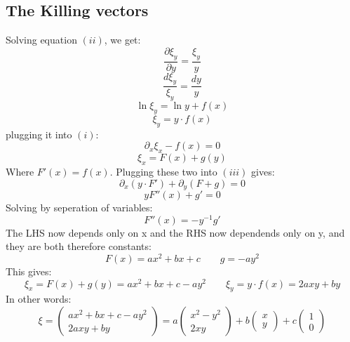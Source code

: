 \documentclass{article}
\begin{document}
\subsection{The Killing vectors}
Solving equation $(ii)$, we get:
\begin{equation}
    \frac{\partial \xi_y}{\partial y} = \frac{\xi_y}{y}
\end{equation}
\begin{equation}
    \frac{d\xi_y}{\xi_y} = \frac{dy}{y}
\end{equation}
\begin{equation}
    \ln \xi_y = \ln y + f(x)
\end{equation}
\begin{equation}
    \xi_y = y \cdot f(x)
\end{equation}
plugging it into $(i)$:
\begin{equation}
    \partial_x \xi_x - f(x) = 0
\end{equation}
\begin{equation}
    \xi_x = F(x) + g(y)
\end{equation}
Where $F'(x) = f(x)$. Plugging these two into $(iii)$ gives:
\begin{equation}
    \partial_x \left(y \cdot F'\right) + \partial_y \left(F + g\right) = 0
\end{equation}
\begin{equation}
    y F''(x) + g' = 0
\end{equation}
Solving by seperation of variables:
\begin{equation}
    F''(x) = -y^{-1}g'
\end{equation}
The LHS now depends only on x and the RHS now dependends only on y, and they are both therefore constants:
\begin{equation}
    F(x) = a x^2 + bx + c \qquad g = -a y^2
\end{equation}
This gives:
\begin{equation}
    \xi_x = F(x) + g(y) = ax^2 + bx + c - ay^2 \qquad
    \xi_y = y\cdot f(x) = 2axy + by
\end{equation}
In other words:
\begin{equation}
    \xi = \begin{pmatrix} ax^2 + bx + c - ay^2 \\ 2axy + by \end{pmatrix} =
    a \begin{pmatrix} x^2 - y^2 \\ 2xy \end{pmatrix} +
    b \begin{pmatrix} x \\ y \end{pmatrix} +
    c \begin{pmatrix} 1 \\ 0 \end{pmatrix}
\end{equation}
\end{document}
